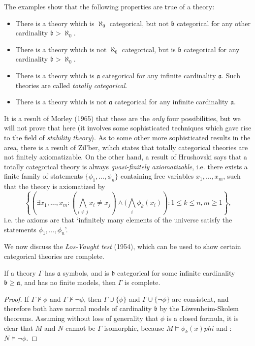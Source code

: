 The examples show that the following properties are true of a theory:
%
\begin{itemize}
    \item There is a theory which is $\aleph_0$ categorical, but not $\mathfrak{b}$ categorical for any other cardinality $\mathfrak{b} > \aleph_0$.

    \item There is a theory which is not $\aleph_0$ categorical, but is $\mathfrak{b}$ categorical for any cardinality $\mathfrak{b} > \aleph_0$.

    \item There is a theory which is $\mathfrak{a}$ categorical for any infinite cardinality $\mathfrak{a}$. Such theories are called \emph{totally categorical}.

    \item There is a theory which is not $\mathfrak{a}$ categorical for any infinite cardinality $\mathfrak{a}$.
\end{itemize}
%
It is a result of Morley (1965) that these are the \emph{only} four possibilities, but we will not prove that here (it involves some sophisticated techniques which gave rise to the field of \emph{stability theory}). As to some other more sophisticated results in the area, there is a result of Zil'ber, wihch states that totally categorical theories are not finitely axiomatizable. On the other hand, a result of Hrushovski says that a totally categorical theory is always \emph{quasi-finitely axiomatizable}, i.e. there exists a finite family of statements $\{ \phi_1,\dots, \phi_n \}$ containing free variables $x_1,\dots,x_m$, such that the theory is axiomatized by
%
\[ \left\{ \left(\exists x_1, \dots, x_m: (\bigwedge_{i \neq j} x_i \neq x_j) \wedge (\bigwedge_i \phi_k(x_i) \right) : 1 \leq k \leq n, m \geq 1 \right\}, \]
%
i.e. the axioms are that `infinitely many elements of the universe satisfy the statements $\phi_1, \dots, \phi_n$'.

We now discuss the \emph{Łos-Vaught test} (1954), which can be used to show certain categorical theories are complete.

\begin{theorem}
    If a theory $\Gamma$ has $\mathfrak{a}$ symbols, and is $\mathfrak{b}$ categorical for some infinite cardinality $\mathfrak{b} \geq \mathfrak{a}$, and has no finite models, then $\Gamma$ is complete.
\end{theorem}
\begin{proof}
    If $\Gamma \not \vdash \phi$ and $\Gamma \not \vdash \neg \phi$, then $\Gamma \cup \{ \phi \}$ and $\Gamma \cup \{ \neg \phi \}$ are consistent, and therefore both have normal models of cardinality $\mathfrak{b}$ by the L\"{o}wenheim-Skolem theorems. Assuming without loss of generality that $\phi$ is a closed formula, it is clear that $M$ and $N$ cannot be $\Gamma$ isomorphic, because $M \vDash \phi_k(x)phi$ and :  $N \vDash \neg \phi$.
\end{proof}

